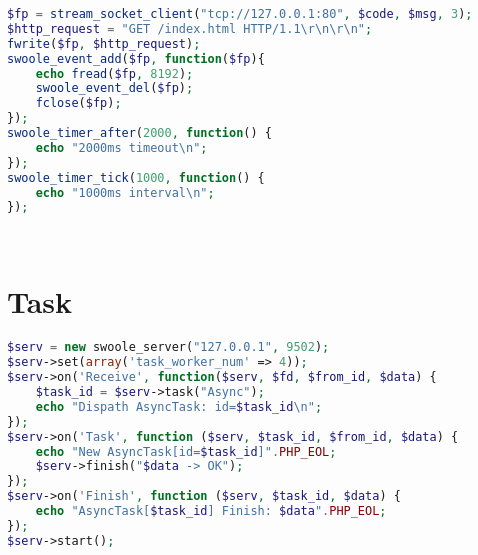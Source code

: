 \begin{lstlisting}[language=PHP]
$fp = stream_socket_client("tcp://127.0.0.1:80", $code, $msg, 3);
$http_request = "GET /index.html HTTP/1.1\r\n\r\n";
fwrite($fp, $http_request);
swoole_event_add($fp, function($fp){
    echo fread($fp, 8192);
    swoole_event_del($fp);
    fclose($fp);
});
swoole_timer_after(2000, function() {
    echo "2000ms timeout\n";
});
swoole_timer_tick(1000, function() {
    echo "1000ms interval\n";
});
\end{lstlisting}




\begin{lstlisting}[language=PHP]

\end{lstlisting}




\begin{lstlisting}[language=PHP]

\end{lstlisting}


\chapter{Task}


\begin{lstlisting}[language=PHP]
$serv = new swoole_server("127.0.0.1", 9502);
$serv->set(array('task_worker_num' => 4));
$serv->on('Receive', function($serv, $fd, $from_id, $data) {
    $task_id = $serv->task("Async");
    echo "Dispath AsyncTask: id=$task_id\n";
});
$serv->on('Task', function ($serv, $task_id, $from_id, $data) {
    echo "New AsyncTask[id=$task_id]".PHP_EOL;
    $serv->finish("$data -> OK");
});
$serv->on('Finish', function ($serv, $task_id, $data) {
    echo "AsyncTask[$task_id] Finish: $data".PHP_EOL;
});
$serv->start();
\end{lstlisting}




\begin{lstlisting}[language=PHP]

\end{lstlisting}






\begin{lstlisting}[language=PHP]

\end{lstlisting}




\begin{lstlisting}[language=PHP]

\end{lstlisting}





